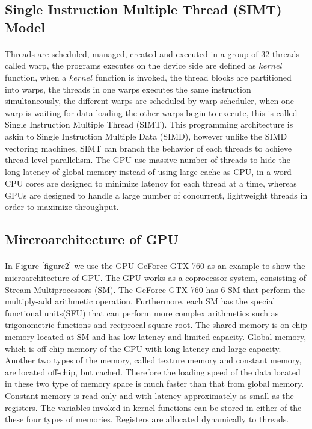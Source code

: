 \documentclass[12pt,a4paper,final]{article}
\begin{document}
\begin{spacing}{2.5}
\subsection{Single Instruction Multiple Thread (SIMT) Model} 
\paragraph{}Threads are scheduled, managed, created and executed in a group of 32 threads called warp, the programs executes on the device side are defined as $\mathit{kernel}$ function, when a $\mathit{kernel}$ function is invoked, the thread blocks are partitioned into warps, the threads in one warps executes the same instruction simultaneously, the different warps are scheduled by warp scheduler, when one warp is waiting for data loading the other warps begin to execute, this is called Single Instruction Multiple Thread (SIMT). This programming architecture is askin to Single Instruction Multiple Data (SIMD), however unlike the SIMD vectoring machines, SIMT can branch the behavior of each threads to achieve thread-level parallelism. The GPU use massive number of threads to hide the long latency of global memory instead of using large cache as CPU, in a word CPU cores are designed to minimize latency for each thread at a time, whereas GPUs are designed to handle a large number of concurrent, lightweight threads in order to maximize throughput.
\subsection{Mircroarchitecture of GPU} 
\paragraph{}In Figure \ref{figure2} we use the GPU-GeForce GTX 760 as an example to show the microarchitecture of  GPU. The GPU works as a coprocessor system, consisting of Stream Multiprocessors (SM). The GeForce GTX 760 has 6 SM that perform the multiply-add arithmetic operation. Furthermore, each SM has the special functional units(SFU) that can perform more complex arithmetics such as trigonometric functions and reciprocal square root. The shared memory is on chip memory located at SM and has low latency and limited capacity. Global memory, which is off-chip memory of the GPU with long latency and large capacity. Another two types of the memory, called texture memory and constant memory, are located off-chip, but cached. Therefore the loading speed of the data located in these two type of memory space is much faster than that from global memory. Constant memory is read only and with latency approximately as small as the registers.  The variables invoked in kernel functions can be stored in either of the these four types of memories. Registers are allocated dynamically to threads.

\end{spacing}
\end{document}
